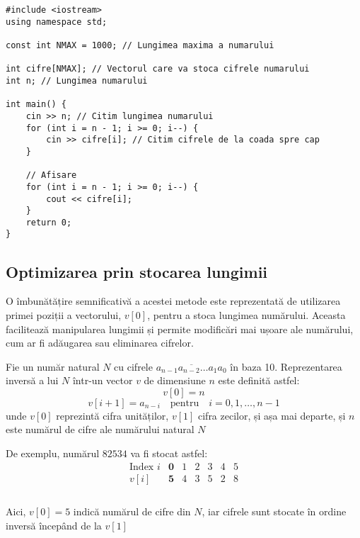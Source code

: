 \begin{verbatim}
#include <iostream>
using namespace std;

const int NMAX = 1000; // Lungimea maxima a numarului

int cifre[NMAX]; // Vectorul care va stoca cifrele numarului
int n; // Lungimea numarului

int main() {
    cin >> n; // Citim lungimea numarului
    for (int i = n - 1; i >= 0; i--) {
        cin >> cifre[i]; // Citim cifrele de la coada spre cap
    }

    // Afisare
    for (int i = n - 1; i >= 0; i--) {
        cout << cifre[i];
    }
    return 0;
}
\end{verbatim}

\subsection{Optimizarea prin stocarea lungimii }

O îmbunătățire semnificativă a acestei metode este reprezentată de utilizarea primei poziții a vectorului, $v[0]$, pentru a stoca lungimea numărului. Aceasta facilitează manipularea lungimii și permite modificări mai ușoare ale numărului, cum ar fi adăugarea sau eliminarea cifrelor.

\begin{definition}\label{def:reprezenatarea_inversa_cu_nr}
Fie un număr natural \( N \) cu cifrele \( \overline{a_{n-1} a_{n-2} \ldots a_1 a_0} \) în baza 10. Reprezentarea inversă a lui \( N \) într-un vector \( v \) de dimensiune \( n \) este definită astfel:
\[ v[0] = n\]
\[ v[i + 1] = a_{n-i} \quad \text{pentru} \quad i = 0, 1, \ldots, n-1 \]
unde \( v[0] \) reprezintă cifra unităților, \( v[1] \) cifra zecilor, și așa mai departe, și \(n\) este numărul de cifre ale numărului natural \(N\)
\end{definition}

De exemplu, numărul $82534$ va fi stocat astfel:
\[
\begin{array}{r|ccccccccc}
\text{Index } i & \boldsymbol{0} & 1 & 2 & 3 & 4 & 5\\
\hline
v[i] & \boldsymbol{5} & 4 & 3 & 5 & 2 & 8 \\
\end{array}
\]\\
Aici, $v[0]=5$ indică numărul de cifre din $N$, iar cifrele sunt stocate în ordine inversă începând de la $v[1]$


